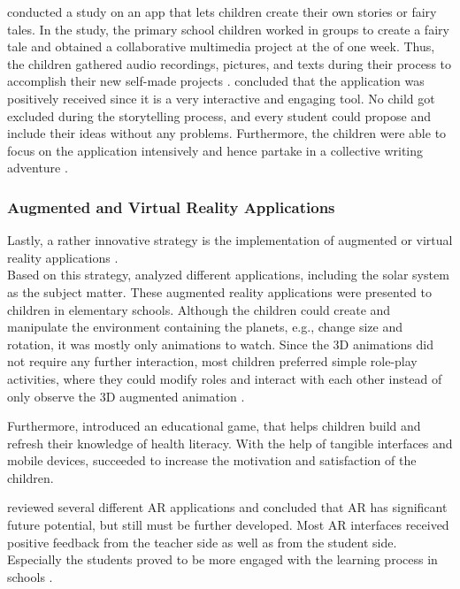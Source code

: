 \textcite{engen2017collaborative} conducted a study on an app that lets children create their own stories or fairy tales. In the study, the primary school children worked in groups to create a fairy tale and obtained a collaborative multimedia project at the of one week. Thus, the children gathered audio recordings, pictures, and texts during their process to accomplish their new self-made projects \autocite{engen2017collaborative}. \textcite{engen2017collaborative} concluded that the application was positively received since it is a very interactive and engaging tool. No child got excluded during the storytelling process, and every student could propose and include their ideas without any problems.
Furthermore, the children were able to focus on the application intensively and hence partake in a collective writing adventure \autocite{engen2017collaborative}.

\subsubsection{Augmented and Virtual Reality Applications}
Lastly, a rather innovative strategy is the implementation of augmented or virtual reality applications \autocite{saidin2015review, lozano2016dedigitalizing}. \\
Based on this strategy, \textcite{kerawalla2006making} analyzed different applications, including the solar system as the subject matter. These augmented reality applications were presented to children in elementary schools.
Although the children could create and manipulate the environment containing the planets, e.g., change size and rotation, it was mostly only animations to watch. Since the 3D animations did not require any further interaction, most children preferred simple role-play activities, where they could modify roles and interact with each other instead of only observe the 3D augmented animation \autocite{kerawalla2006making}.

Furthermore, \textcite{lozano2016dedigitalizing} introduced an educational game, that helps children build and refresh their knowledge of health literacy. With the help of tangible interfaces and mobile devices, \textcite{lozano2016dedigitalizing} succeeded to increase the motivation and satisfaction of the children. 

\textcite{saidin2015review} reviewed several different AR applications and concluded that AR has significant future potential, but still must be further developed. Most AR interfaces received positive feedback from the teacher side as well as from the student side. Especially the students proved to be more engaged with the learning process in schools \autocite{saidin2015review}.

